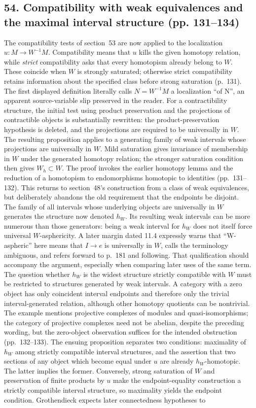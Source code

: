 \documentclass[10pt,oneside]{book}
\begin{document}
\subsection*{54. Compatibility with weak equivalences and the maximal interval structure (pp. 131--134)}
The compatibility tests of section~53 are now applied to the localization $u:M\to W^{-1}M$. Compatibility means that $u$ kills the given homotopy relation, while \emph{strict} compatibility asks that every homotopism already belong to $W$. These coincide when $W$ is strongly saturated; otherwise strict compatibility retains information about the specified class before strong saturation (p.~131). The first displayed definition literally calls $N=W^{-1}M$ a localization ``of N'', an apparent source-variable slip preserved in the reader. For a contractibility structure, the initial test using product preservation and the projections of contractible objects is substantially rewritten: the product-preservation hypothesis is deleted, and the projections are required to be universally in $W$. The resulting proposition applies to a generating family of weak intervals whose projections are universally in $W$. Mild saturation gives invariance of membership in $W$ under the generated homotopy relation; the stronger saturation condition then gives $W_h\subset W$. The proof invokes the earlier homotopy lemma and the reduction of a homotopism to endomorphisms homotopic to identities (pp.~131--132). This returns to section~48's construction from a class of weak equivalences, but deliberately abandons the old requirement that the endpoints be disjoint. The family of all intervals whose underlying objects are universally in $W$ generates the structure now denoted $h_W$. Its resulting weak intervals can be more numerous than those generators: being a weak interval for $h_W$ does not itself force universal $W$-asphericity. A later margin dated 11.4 expressly warns that ``W-aspheric'' here means that $I\to e$ is universally in $W$, calls the terminology ambiguous, and refers forward to p.~181 and following. That qualification should accompany the argument, especially when comparing later uses of the same term. The question whether $h_W$ is the widest structure strictly compatible with $W$ must be restricted to structures generated by weak intervals. A category with a zero object has only coincident interval endpoints and therefore only the trivial interval-generated relation, although other homotopy quotients can be nontrivial. The example mentions projective complexes of modules and quasi-isomorphisms; the category of projective complexes need not be abelian, despite the preceding wording, but the zero-object observation suffices for the intended obstruction (pp.~132--133). The ensuing proposition separates two conditions: maximality of $h_W$ among strictly compatible interval structures, and the assertion that two sections of any object which become equal under $u$ are already $h_W$-homotopic. The latter implies the former. Conversely, strong saturation of $W$ and preservation of finite products by $u$ make the endpoint-equality construction a strictly compatible interval structure, so maximality yields the endpoint condition. Grothendieck expects later connectedness hypotheses to 
\end{document}
